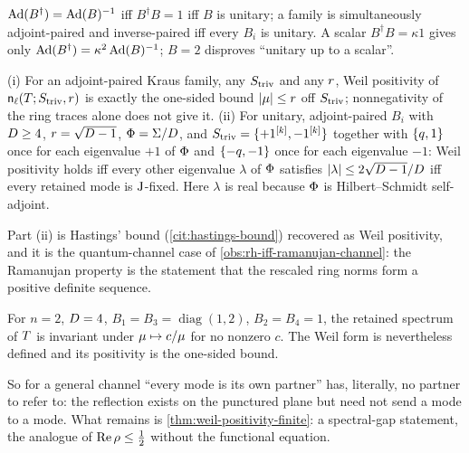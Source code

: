 \begin{proposition}
\label{prop:kraus-both-pairings-unitary}
$\operatorname{Ad}(B^\dagger) = \operatorname{Ad}(B)^{-1}$ iff $B^\dagger B = 1$ iff $B$ is unitary; a family is
simultaneously adjoint-paired and inverse-paired iff every $B_i$ is unitary. A scalar
$B^\dagger B = \kappa1$ gives only $\operatorname{Ad}(B^\dagger) = \kappa^2\operatorname{Ad}(B)^{-1}$; $B = 2$ disproves
``unitary up to a scalar''.
\end{proposition}

\begin{theorem}
\label{thm:kraus-weil-criterion}
(i) For an adjoint-paired Kraus family, any $S_{\mathrm{triv}}$ and any $r$, Weil positivity of
$\mathsf n_{\ell}(T;S_{\mathrm{triv}},r)$ is exactly the one-sided bound $|\mu|\le r$ off
$S_{\mathrm{triv}}$; nonnegativity of the ring traces alone does not give it. (ii) For unitary,
adjoint-paired $B_i$ with $D\ge4$, $r = \sqrt{D-1}$, $\Phi = \Sigma/D$, and
$S_{\mathrm{triv}} = \{+1^{[k]},-1^{[k]}\}$ together with $\{q,1\}$ once for each eigenvalue $+1$
of $\Phi$ and $\{-q,-1\}$ once for each eigenvalue $-1$: Weil positivity holds iff every
other eigenvalue $\lambda$ of $\Phi$ satisfies $|\lambda|\le2\sqrt{D-1}/D$ iff every
retained mode is $\mathrm{J}$-fixed. Here $\lambda$ is real because $\Phi$ is Hilbert--Schmidt
self-adjoint.
\end{theorem}

Part (ii) is Hastings' bound (\cref{cit:hastings-bound}) recovered as Weil positivity, and
it is the quantum-channel case of \cref{obs:rh-iff-ramanujan-channel}: the Ramanujan
property is the statement that the rescaled ring norms form a positive definite sequence.

\begin{proposition}
\label{prop:kraus-no-duality-example}
For $n = 2$, $D = 4$, $B_1 = B_3 = \operatorname{diag}(1,2)$, $B_2 = B_4 = 1$, the
retained spectrum of $T$ is invariant under $\mu\mapsto c/\mu$ for no nonzero
$c$. The Weil form is nevertheless defined and its positivity is the one-sided bound.
\end{proposition}

So for a general channel ``every mode is its own partner'' has, literally, no partner to
refer to: the reflection exists on the punctured plane but need not send a mode to a mode.
What remains is \cref{thm:weil-positivity-finite}: a spectral-gap statement, the analogue
of $\operatorname{Re}\rho\le\frac12$ without the functional equation.
